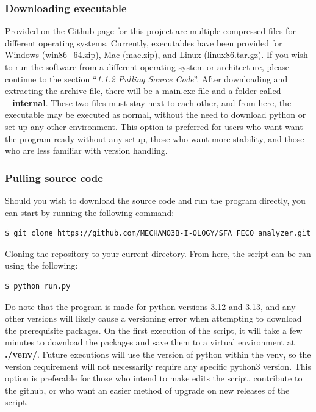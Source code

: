 \documentclass[12pt]{extarticle}
\begin{document}
		\subsubsection{Downloading executable}

			Provided on the \href{https://github.com/MECHANO3B-I-OLOGY/SFA_FECO_analyzer}{Github page} for this project are multiple compressed files for different operating systems. Currently, executables have been provided for Windows (win86\_64.zip), Mac (mac.zip), and Linux (linux86.tar.gz). If you wish to run the software from a different operating system or architecture, please continue to the section ``\textit{1.1.2 Pulling Source Code}''.
			After downloading and extracting the archive file, there will be a main.exe file and a folder called \textbf{\_internal}. These two files must stay next to each other, and from here, the executable may be executed as normal, without the need to download python or set up any other environment. 
			This option is preferred for users who want want the program ready without any setup, those who want more stability, and those who are less familiar with version handling. 

		\subsubsection{Pulling source code}

			Should you wish to download the source code and run the program directly, you can start by running the following command:

			\begin{lstlisting}[style=cmd]
$ git clone https://github.com/MECHANO3B-I-OLOGY/SFA_FECO_analyzer.git
			\end{lstlisting}

			Cloning the repository to your current directory. From here, the script can be ran using the following:

			\begin{lstlisting}[style=cmd]
$ python run.py
			\end{lstlisting}

			Do note that the program is made for python versions 3.12 and 3.13, and any other versions will likely cause a versioning error when attempting to download the prerequisite packages.
			On the first execution of the script, it will take a few minutes to download the packages and save them to a virtual environment at \textbf{./venv/}. 
			Future executions will use the version of python within the venv, so the version requirement will not necessarily require any specific python3 version.
			This option is preferable for those who intend to make edits the script, contribute to the github, or who want an easier method of upgrade on new releases of the script.
\end{document}
